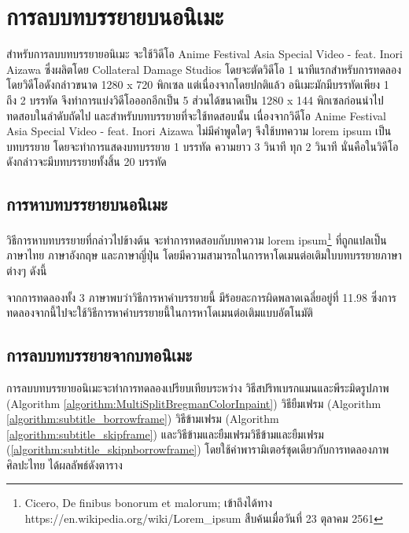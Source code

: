 \section{การลบบทบรรยายบนอนิเมะ}
\hspace{1cm} สำหรับการลบบทบรรยายอนิเมะ จะใช้วิดีโอ Anime Festival Asia Special Video - feat. Inori Aizawa ซึ่งผลิตโดย Collateral Damage Studios โดยจะตัดวิดีโอ 1 นาทีแรกสำหรับการทดลอง โดยวิดีโอดังกล่าวขนาด 1280 x 720 พิกเซล แต่เนื่องจากโดยปกติแล้ว อนิเมะมักมีบรรทัดเพียง 1 ถึง 2 บรรทัด จึงทำการแบ่งวิดีโอออกอีกเป็น 5 ส่วนได้ขนาดเป็น 1280 x 144 พิกเซลก่อนนำไปทดสอบในลำดับถัดไป และสำหรับบทบรรยายที่จะใช้ทดสอบนั้น เนื่องจากวิดีโอ Anime Festival Asia Special Video - feat. Inori Aizawa ไม่มีคำพูดใดๆ จึงใช้บทความ lorem ipsum เป็นบทบรรยาย โดยจะทำการแสดงบทบรรยาย 1 บรรทัด ความยาว 3 วินาที ทุก 2 วินาที นั่นคือในวิดีโอดังกล่าวจะมีบทบรรยายทั้งสิ้น 20 บรรทัด	
	


\subsection{การหาบทบรรยายบนอนิเมะ}	
    
\hspace{1cm} วิธีการหาบทบรรยายที่กล่าวไปข้างต้น จะทำการทดสอบกับบทความ lorem ipsum\footnote{Cicero, De finibus bonorum et malorum; เข้าถึงได้ทาง https://en.wikipedia.org/wiki/Lorem\_ipsum สืบค้นเมื่อวันที่ 23 ตุลาคม 2561} ที่ถูกแปลเป็นภาษาไทย ภาษาอังกฤษ และภาษาญี่ปุ่น โดยมีความสามารถในการหาโดเมนต่อเติมใบบทบรรยายภาษาต่างๆ ดังนี้


	

\hspace{1cm} จากการทดลองทั้ง  3 ภาษาพบว่าวิธีการหาคำบรรยายนี้ มีร้อยละการผิดพลาดเฉลี่ยอยู่ที่ 11.98 ซึ่งการทดลองจากนี้ไปจะใช้วิธีการหาคำบรรยายนี้ในการหาโดเมนต่อเติมแบบอัตโนมัติ

\subsection{การลบบทบรรยายจากบทอนิเมะ}

\hspace{1cm} การลบบทบรรยายอนิเมะจะทำการทดลองเปรียบเทียบระหว่าง วิธีสปริทเบรกแมนและพีระมิดรูปภาพ (Algorithm \ref{algorithm:MultiSplitBregmanColorInpaint}) วิธียืมเฟรม (Algorithm \ref{algorithm:subtitle_borrowframe}) วิธีข้ามเฟรม (Algorithm \ref{algorithm:subtitle_skipframe}) และวิธีข้ามและยืมเฟรมวิธีข้ามและยืมเฟรม (\ref{algorithm:subtitle_skipnborrowframe}) โดยใช้ค่าพารามิเตอร์ชุดเดียวกับการทดลองภาพศิลปะไทย ได้ผลลัพธ์ดังตาราง 

